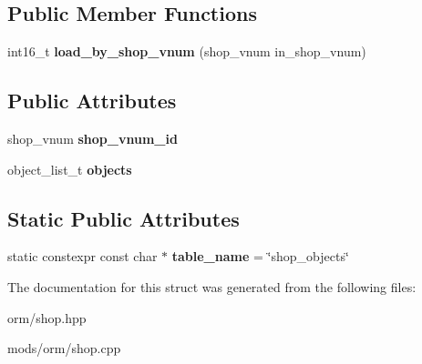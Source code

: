 \subsection*{Public Member Functions}
\begin{DoxyCompactItemize}
\item 
\mbox{\label{structmods_1_1orm_1_1shop__objects_ab8396d7c2b1aa803dbbe83e64e198e15}} 
int16\+\_\+t {\bfseries load\+\_\+by\+\_\+shop\+\_\+vnum} (shop\+\_\+vnum in\+\_\+shop\+\_\+vnum)
\end{DoxyCompactItemize}
\subsection*{Public Attributes}
\begin{DoxyCompactItemize}
\item 
\mbox{\label{structmods_1_1orm_1_1shop__objects_a673e6ff8a83360120b02c2cb33524170}} 
shop\+\_\+vnum {\bfseries shop\+\_\+vnum\+\_\+id}
\item 
\mbox{\label{structmods_1_1orm_1_1shop__objects_a73edb392f00af25843b66693a5653466}} 
object\+\_\+list\+\_\+t {\bfseries objects}
\end{DoxyCompactItemize}
\subsection*{Static Public Attributes}
\begin{DoxyCompactItemize}
\item 
\mbox{\label{structmods_1_1orm_1_1shop__objects_a8f89e1e63ec3d71c9f6f33b5bf088865}} 
static constexpr const char $\ast$ {\bfseries table\+\_\+name} = \char`\"{}shop\+\_\+objects\char`\"{}
\end{DoxyCompactItemize}


The documentation for this struct was generated from the following files\+:\begin{DoxyCompactItemize}
\item 
orm/shop.\+hpp\item 
mods/orm/shop.\+cpp\end{DoxyCompactItemize}
